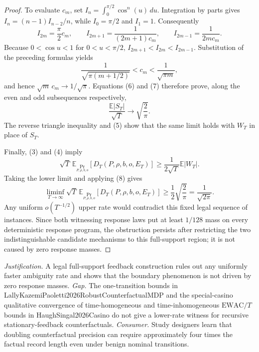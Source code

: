 \documentclass{article}
\begin{document}
\begin{proof}
To evaluate \(c_m\), set \(I_n=\int_0^{\pi/2}\cos^n(u)\,du\).  Integration by parts gives \(I_n=(n-1)I_{n-2}/n\), while \(I_0=\pi/2\) and \(I_1=1\).  Consequently
\[
 I_{2m}=\frac\pi2c_m,
 \qquad
 I_{2m+1}=\frac1{(2m+1)c_m},
 \qquad
 I_{2m-1}=\frac1{2m c_m}.
\]
Because \(0<\cos u<1\) for \(0<u<\pi/2\),
\(I_{2m+1}<I_{2m}<I_{2m-1}\).  Substitution of the preceding formulas yields
\[
 \frac1{\sqrt{\pi(m+1/2)}}<c_m<\frac1{\sqrt{\pi m}},
\]
and hence \(\sqrt m\,c_m\to1/\sqrt\pi\).  Equations (6) and (7) therefore prove, along the even and odd subsequences respectively,
\[
 \frac{\mathbb E|S_T|}{\sqrt T}\longrightarrow\sqrt{\frac2\pi}.
 \tag{8}
\]
The reverse triangle inequality and (5) show that the same limit holds with \(W_T\) in place of \(S_T\).

Finally, (3) and (4) imply
\[
 \sqrt T\,\mathbb E_{\Pr_{P,\rho,b,o}}[D_T(P,\rho,b,o,E_T)]
 \ge \frac1{2\sqrt T}\mathbb E|W_T|.
\]
Taking the lower limit and applying (8) gives
\[
 \liminf_{T\to\infty}\sqrt T\,
 \mathbb E_{\Pr_{P,\rho,b,o}}[D_T(P,\rho,b,o,E_T)]
 \ge\frac12\sqrt{\frac2\pi}=\frac1{\sqrt{2\pi}}.
\]
Any uniform \(o(T^{-1/2})\) upper rate would contradict this fixed legal sequence of instances.  Since both witnessing response laws put at least \(1/128\) mass on every deterministic response program, the obstruction persists after restricting the two indistinguishable candidate mechanisms to this full-support region; it is not caused by zero response masses.
\end{proof}
\par\smallskip\noindent \textit{Justification.} A legal full-support feedback construction rules out any uniformly faster ambiguity rate and shows that the boundary phenomenon is not driven by zero response masses. \textit{Gap.} The one-transition bounds in LallyKazemiPaoletti2026RobustCounterfactualMDP and the special-casino qualitative convergence of time-homogeneous and time-inhomogeneous \(\mathrm{EWAC}/T\) bounds in HaughSingal2026Casino do not give a lower-rate witness for recursive stationary-feedback counterfactuals. \textit{Consumer.} Study designers learn that doubling counterfactual precision can require approximately four times the factual record length even under benign nominal transitions.
\end{document}
